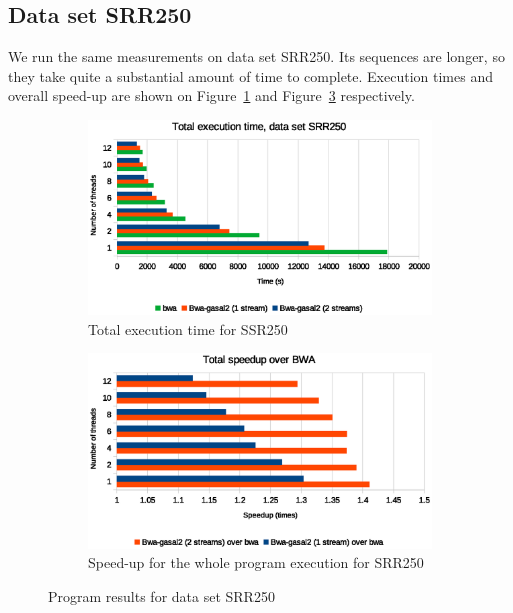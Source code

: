 \subsection{Data set SRR250}

We run the same measurements on data set SRR250. Its sequences are longer, so they take quite a substantial amount of time to complete. Execution times and overall speed-up are shown on Figure~\ref{fig:total-exec-time-srr250} and Figure~\ref{fig:total-exec-speed-up-srr250} respectively.


\begin{figure}[p]
	\centering
	\begin{subfigure}[t]{1\textwidth}
		\centering
		\includegraphics[width=1\textwidth]{srr250/total-exec-time-srr250}
		\caption{Total execution time for SSR250}
		\label{fig:total-exec-time-srr250}
	\end{subfigure}%
	
	\begin{subfigure}[b]{1\textwidth}
		\centering
		\includegraphics[width=1\textwidth]{srr250/total-exec-speed-up-srr250}
		\caption{Speed-up for the whole program execution for SRR250}
		\label{fig:total-exec-speed-up-srr250}
	\end{subfigure}
	\caption{Program results for data set SRR250}
\end{figure}

